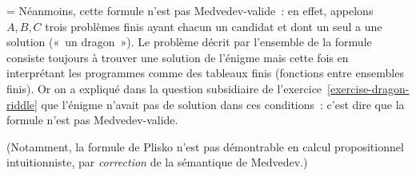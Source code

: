 \documentclass[12pt,a4paper]{article}
\theoremstyle{definition}
\newif\ifcorrige
\newenvironment{corrige}%
{\ifcorrige\relax\else\setbox0=\vbox\bgroup\fi%
\smallbreak\footnotesize\noindent{\underbar{\textit{Corrigé.}}\quad}}
{{\hbox{}\nobreak\hfill\checkmark}%
\ifcorrige\relax\else\egroup\fi\par}
\begin{document}
\begin{corrige}
Néanmoins, cette formule n'est pas Medvedev-valide : en effet,
appelons $A,B,C$ trois problèmes finis ayant chacun un candidat et
dont un seul a une solution (« un dragon »).  Le problème décrit par
l'ensemble de la formule consiste toujours à trouver une solution de
l'énigme mais cette fois en interprétant les programmes comme des
tableaux finis (fonctions entre ensembles finis).  Or on a expliqué
dans la question subsidiaire de
l'exercice \ref{exercise-dragon-riddle} que l'énigme n'avait pas de
solution dans ces conditions : c'est dire que la formule n'est pas
Medvedev-valide.

(Notamment, la formule de Plisko n'est pas démontrable en calcul
propositionnel intuitionniste, par \emph{correction} de la sémantique
de Medvedev.)
\end{corrige}


%
%
%
\end{document}
